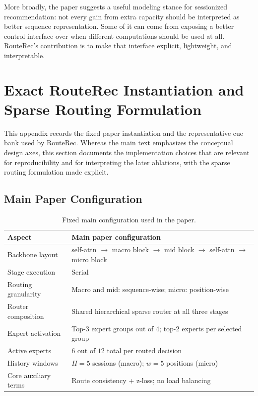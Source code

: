 \documentclass[sigconf,review,anonymous]{acmart}
\begin{document}
More broadly, the paper suggests a useful modeling stance for sessionized recommendation: not every gain from extra capacity should be interpreted as better sequence representation. Some of it can come from exposing a better control interface over when different computations should be used at all. RouteRec's contribution is to make that interface explicit, lightweight, and interpretable.

\clearpage
\balance



\clearpage
\appendix

\section{Exact RouteRec Instantiation and Sparse Routing Formulation}
\label{app:method-details}
This appendix records the fixed paper instantiation and the representative cue bank used by RouteRec. Whereas the main text emphasizes the conceptual design axes, this section documents the implementation choices that are relevant for reproducibility and for interpreting the later ablations, with the sparse routing formulation made explicit.

\subsection{Main Paper Configuration}

\begin{table}[H]
  \centering
  \caption{Fixed main configuration used in the paper.}
  \label{tab:appendix-main-setting}
  \footnotesize
  \setlength{\tabcolsep}{4pt}
  \renewcommand{\arraystretch}{1.07}
  \begin{tabularx}{\columnwidth}{@{}L{0.30\columnwidth}>{\raggedright\arraybackslash}X@{}}
    \toprule
    Aspect & Main paper configuration \\
    \midrule
    Backbone layout & self-attn $\to$ macro block $\to$ mid block $\to$ self-attn $\to$ micro block \\
    Stage execution & Serial \\
    Routing granularity & Macro and mid: sequence-wise; micro: position-wise \\
    Router composition & Shared hierarchical sparse router at all three stages \\
    Expert activation & Top-$3$ expert groups out of $4$; top-$2$ experts per selected group \\
    Active experts & $6$ out of $12$ total per routed decision \\
    History windows & $H=5$ sessions (macro); $w=5$ positions (micro) \\
    Core auxiliary terms & Route consistency + z-loss; no load balancing \\
    \bottomrule
  \end{tabularx}
\end{table}
\end{document}

